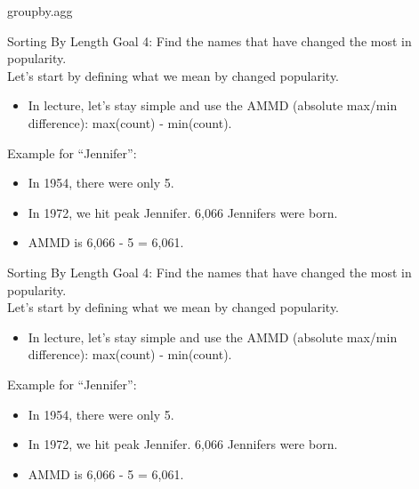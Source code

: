 \documentclass[aspectratio=169]{../latex_main/tntbeamer}  %
\begin{document}
    \begin{frame}{groupby.agg}
        
    \end{frame}
    
    
    \begin{frame}{Sorting By Length}
        Goal 4: Find the names that have changed the most in popularity.\\
        \bigskip
        Let’s start by defining what we mean by changed popularity.
        \begin{itemize}
            \item In lecture, let’s stay simple and use the AMMD (absolute max/min difference): max(count) - min(count). %


        \end{itemize}
        \bigskip
        Example for “Jennifer”:
        \begin{itemize}
            \item In 1954, there were only 5.
            \item In 1972, we hit peak Jennifer. 6,066 Jennifers were born.
            \item AMMD is 6,066 - 5 = 6,061.
        \end{itemize}
    \end{frame}
    
    
    
    \begin{frame}{Sorting By Length}
        Goal 4: Find the names that have changed the most in popularity.\\
        \bigskip
        Let’s start by defining what we mean by changed popularity.
        \begin{itemize}
            \item In lecture, let’s stay simple and use the AMMD (absolute max/min difference): max(count) - min(count). %


        \end{itemize}
        \bigskip
        Example for “Jennifer”:
        \begin{itemize}
            \item In 1954, there were only 5.
            \item In 1972, we hit peak Jennifer. 6,066 Jennifers were born.
            \item AMMD is 6,066 - 5 = 6,061.
        \end{itemize}
    \end{frame}
    
\end{document}
